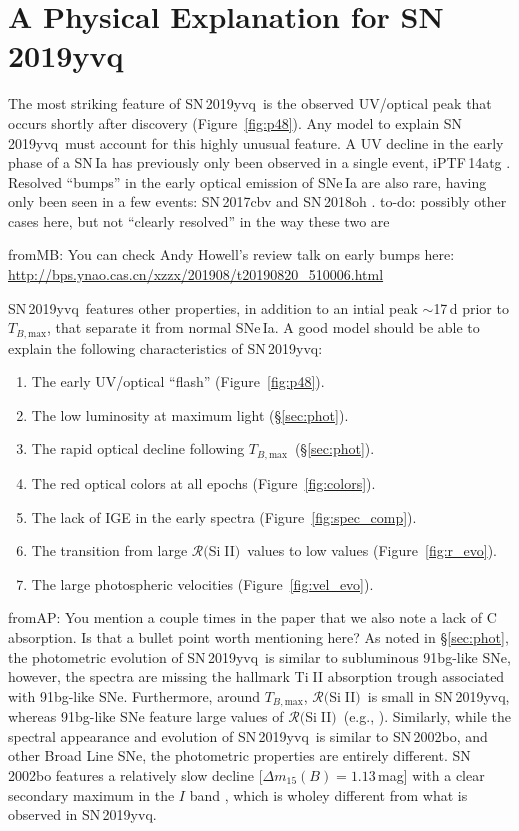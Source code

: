 \documentclass[twocolumn]{aastex63}
\def\ion#1#2{#1$\;${\footnotesize\rm{#2}}\relax}
\newcommand{\frommb}[1]{{\color{purple} fromMB: {#1}}}
\newcommand{\fromabi}[1]{{\color{teal} fromAP: {#1}}}
\newcommand{\todo}[1]{{\color{magenta} to-do: {#1}}}
\newcommand{\tbmax}{$T_{B,\mathrm{max}}$}
\newcommand{\RSiII}{$\mathcal{R}($\ion{Si}{II}$)$}
\newcommand{\sn}{SN\,2019yvq}
\begin{document}
\section{A Physical Explanation for \sn}\label{sec:models}

The most striking feature of \sn\ is the observed UV/optical peak that occurs
shortly after discovery (Figure~\ref{fig:p48}). Any model to explain \sn\ must
account for this highly unusual feature. A UV decline in the early phase of a
SN\,Ia has previously only been observed in a single event, iPTF\,14atg
\citep{Cao15}. Resolved ``bumps'' in the early optical emission of SNe\,Ia are
also rare, having only been seen in a few events: SN\,2017cbv
\citep{Hosseinzadeh17} and SN\,2018oh \citep{Shappee19,Dimitriadis19}.
\todo{possibly other cases here, but not ``clearly resolved'' in the way these
two are}

\frommb{You can check Andy Howell's review talk on early bumps here: \url{http://bps.ynao.cas.cn/xzzx/201908/t20190820_510006.html}}

\sn\ features other properties, in addition to an intial peak $\sim$17\,d
prior to \tbmax, that separate it from normal SNe\,Ia. A good model should be
able to explain the following characteristics of \sn:
%
\begin{enumerate}
    \item The early UV/optical ``flash'' (Figure~\ref{fig:p48}).
    \item The low luminosity at maximum light (\S\ref{sec:phot}). 
    \item The rapid optical decline following \tbmax\ (\S\ref{sec:phot}). 
    \item The red optical colors at all epochs (Figure~\ref{fig:colors}). 
    \item The lack of IGE in the early spectra (Figure~\ref{fig:spec_comp}).
    \item The transition from large \RSiII\ values to low values (Figure~\ref{fig:r_evo}).
    \item The large photospheric velocities (Figure~\ref{fig:vel_evo}).
\end{enumerate}
%
\fromabi{You mention a couple times in the paper that we also note a lack of C absorption. Is that a bullet point worth mentioning here?}
As noted in \S\ref{sec:phot}, the photometric evolution of \sn\ is similar to
subluminous 91bg-like SNe, however, the spectra are missing the hallmark
\ion{Ti}{II} absorption trough associated with 91bg-like SNe. Furthermore,
around \tbmax, \RSiII\ is small in \sn, whereas 91bg-like SNe feature large
values of \RSiII\ (e.g., \citealt{Branch09}). Similarly, while the spectral
appearance and evolution of \sn\ is similar to SN\,2002bo, and other
\citeauthor{Branch06} Broad Line SNe, the photometric properties are entirely
different. SN\,2002bo features a relatively slow decline [$\Delta{m}_{15}(B) =
1.13$\,mag] with a clear secondary maximum in the $I$ band \citep{Benetti04},
which is wholey different from what is observed in \sn.
\end{document}
